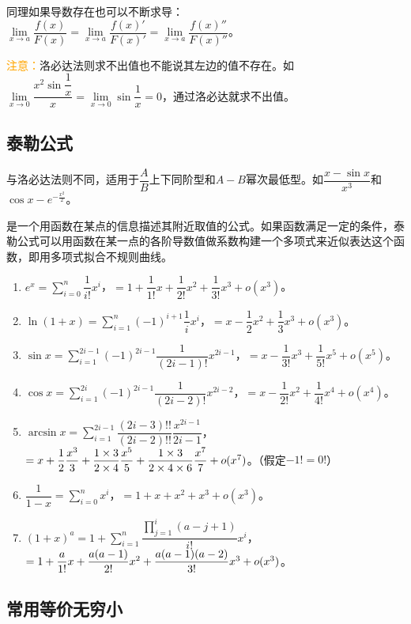 \documentclass[UTF8, 12pt]{ctexart}
\begin{document}
同理如果导数存在也可以不断求导：$\lim\limits_{x\to a}\dfrac{f(x)}{F(x)}=\lim\limits_{x\to a}\dfrac{f(x)'}{F(x)'}=\lim\limits_{x\to a}\dfrac{f(x)''}{F(x)''}$。

\textcolor{orange}{注意：}洛必达法则求不出值也不能说其左边的值不存在。如$\lim\limits_{x\to0}\dfrac{x^2\sin\dfrac{1}{x}}{x}=\lim\limits_{x\to0}\sin\dfrac{1}{x}=0$，通过洛必达就求不出值。

\subsection{泰勒公式}

与洛必达法则不同，适用于$\dfrac{A}{B}$上下同阶型和$A-B$幂次最低型。如$\dfrac{x-\sin x}{x^3}$和$\cos x-e^{-\frac{x^2}{2}}$。

是一个用函数在某点的信息描述其附近取值的公式。如果函数满足一定的条件，泰勒公式可以用函数在某一点的各阶导数值做系数构建一个多项式来近似表达这个函数，即用多项式拟合不规则曲线。

\begin{enumerate}
    \item $e^x=\sum\limits_{i=0}^n\dfrac{1}{i!}x^i$，$=1+\dfrac{1}{1!}x+\dfrac{1}{2!}x^2+\dfrac{1}{3!}x^3+o(x^3)$。
    \item $\ln(1+x)=\sum\limits_{i=1}^n(-1)^{i+1}\dfrac{1}{i}x^i$，$=x-\dfrac{1}{2}x^2+\dfrac{1}{3}x^3+o(x^3)$。
    \item $\sin x=\sum\limits_{i=1}^{2i-1}(-1)^{2i-1}\dfrac{1}{(2i-1)!}x^{2i-1}$，$=x-\dfrac{1}{3!}x^3+\dfrac{1}{5!}x^5+o(x^5)$。
    \item $\cos x=\sum\limits_{i=1}^{2i}(-1)^{2i-1}\dfrac{1}{(2i-2)!}x^{2i-2}$，$=x-\dfrac{1}{2!}x^2+\dfrac{1}{4!}x^4+o(x^4)$。
    \item $\arcsin x=\sum\limits_{i=1}^{2i-1}\dfrac{(2i-3)!!}{(2i-2)!!}\dfrac{x^{2i-1}}{2i-1}$，$=x+\dfrac{1}{2}\dfrac{x^3}{3}+\dfrac{1\times3}{2\times4}\dfrac{x^5}{5}+\dfrac{1\times3\time5}{2\times4\times6}\dfrac{x^7}{7}+o(x^7)$。（假定$-1!=0!$）
    \item $\dfrac{1}{1-x}=\sum\limits_{i=0}^nx^i$，$=1+x+x^2+x^3+o(x^3)$。
    \item $(1+x)^a=1+\sum\limits_{i=1}^n\dfrac{\prod_{j=1}^i(a-j+1)}{i!}x^i$，$=1+\dfrac{a}{1!}x+\dfrac{a(a-1)}{2!}x^2\\+\dfrac{a(a-1)(a-2)}{3!}x^3+o(x^3)$。
\end{enumerate}

\subsection{常用等价无穷小}
\end{document}
